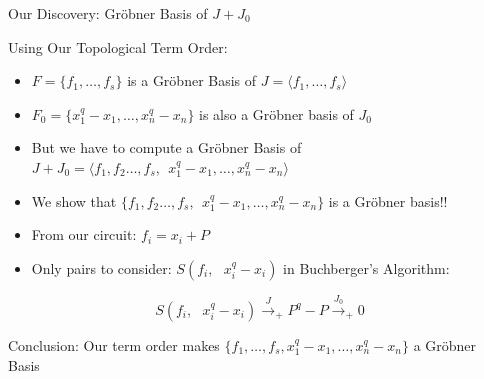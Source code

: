 \documentclass[xcolor=dvipsnames]{beamer}
\begin{document}
\begin{frame}{\large{Our Discovery: Gr\"obner Basis of $J + J_0$}}

Using Our Topological Term Order:
\begin{itemize}
\item $F = \{ f_1, \dots, f_s\}$ is a Gr\"obner Basis of $J = \langle
  f_1, \dots, f_s\rangle$
\item $F_0 = \{x_1^q - x_1, \dots, x_n^q - x_n\}$ is also a Gr\"obner
  basis of $J_0$
\item But we have to compute a Gr\"obner Basis of $J + J_0 = \langle
  f_1, f_2 \ldots, f_s, ~~ x_1^q   - x_1, \dots, x_n^q - x_n\rangle$
\item We show that $\{f_1, f_2 \ldots, f_s, ~~ x_1^q   - x_1, \dots,
  x_n^q - x_n\}$ is a Gr\"obner basis!!
\item From our circuit: $f_i = x_i + P$
\item Only pairs to consider: $S(f_i, ~~~x_i^q - x_i)$ in Buchberger's Algorithm:
\end{itemize}

\[
S(f_i, ~~~x_i^q - x_i) \stackrel{J}{\textstyle\longrightarrow}_+ P^q -
P \stackrel{J_0}{\textstyle\longrightarrow}_+ 0
\]

Conclusion: Our term order makes $\{f_1, \dots, f_s, x_1^q - x_1,
\dots, x_n^q - x_n\}$ a Gr\"obner Basis
\end{frame}
\end{document}
